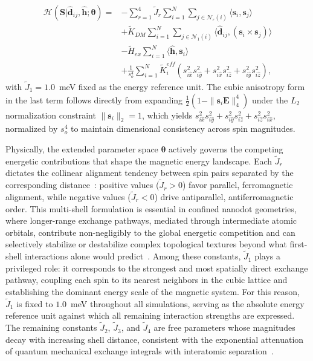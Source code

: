 \documentclass[final,5p,times,twocolumn]{elsarticle}
\begin{document}
\begin{equation}\label{eq:Hamiltonian}
\begin{split}
\mathcal{H}\left(\mathbf{S}|\hat{\mathbf{d}}_{ij},\hat{\mathbf{h}};
\boldsymbol{\theta}\right) ={}
&- \sum_{r=1}^{4}\tilde{J}_r
    \sum_{i=1}^{N}\sum_{j\in \mathcal{N}_r(i)}
    \langle \mathbf{s}_i, \mathbf{s}_j \rangle \\
&+ \tilde{K}_{DM} \sum_{i=1}^{N}\sum_{j\in \mathcal{N}_1(i)}
    \langle \hat{\mathbf{d}}_{ij},(\mathbf{s}_i \times \mathbf{s}_j)
    \rangle \\
&- \tilde{H}_{ex} \sum_{i=1}^{N}
    \langle \hat{\mathbf{h}}, \mathbf{s}_i \rangle \\
&+ \frac{1}{s_o^4}\sum_{i=1}^{N} \tilde{K}_i^{eff}
    \left(s_{i\hat{x}}^2 s_{i\hat{y}}^2 +
          s_{i\hat{x}}^2 s_{i\hat{z}}^2 +
          s_{i\hat{y}}^2 s_{i\hat{z}}^2\right),
\end{split}
\end{equation}
with $\tilde{J}_1 = 1.0$~meV fixed as the energy reference unit. The cubic anisotropy form in the last term follows directly from expanding $\frac{1}{2}(1 - \|\mathbf{s}_i\mathbf{E}\|_4^4)$ under the $L_2$ normalization constraint $\|\mathbf{s}_i\|_2 = 1$, which 
yields $s_{i\hat{x}}^2 s_{i\hat{y}}^2 + s_{i\hat{y}}^2 
s_{i\hat{z}}^2 + s_{i\hat{z}}^2 s_{i\hat{x}}^2$, normalized by $s_o^4$ to maintain dimensional consistency across spin magnitudes.

Physically, the extended parameter space $\boldsymbol{\theta}$ actively governs the competing energetic contributions that shape the magnetic energy landscape. Each $\tilde{J}_r$ dictates the collinear alignment tendency between spin pairs separated by the corresponding distance~\cite{borisov2021heisenberg}: positive values ($\tilde{J}_r > 0$) favor parallel, ferromagnetic 
alignment, while negative values ($\tilde{J}_r < 0$) drive 
antiparallel, antiferromagnetic order. This multi-shell formulation is essential in confined nanodot geometries, where longer-range exchange pathways, mediated through intermediate atomic orbitals, contribute non-negligibly to the global energetic competition and can selectively stabilize or destabilize complex topological textures beyond what first-shell interactions alone would predict~\cite{eriksson2017atomistic}. Among these constants, $\tilde{J}_1$ plays a privileged role: it 
corresponds to the strongest and most spatially direct exchange pathway, coupling each spin to its nearest neighbors in the cubic lattice and establishing the dominant energy scale of the magnetic system. For this reason, $\tilde{J}_1$ is fixed to $1.0$~meV throughout all simulations, serving as the absolute energy reference unit against which all remaining interaction strengths are expressed. The remaining constants $\tilde{J}_2$, $\tilde{J}_3$, and $\tilde{J}_4$ are free parameters whose magnitudes decay with increasing shell distance, consistent with the exponential attenuation of quantum mechanical exchange integrals with interatomic separation~\cite{borisov2021heisenberg}.
\end{document}
